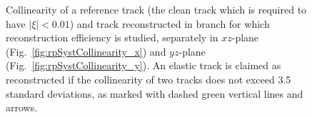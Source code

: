 \begin{figure}[b!]
\centering
\parbox{0.4725\textwidth}{
  \centering
  \begin{subfigure}[b]{\linewidth}
  \end{subfigure}
}%
\quad\quad%
\parbox{0.4725\textwidth}{
  \centering
  \begin{subfigure}[b]{\linewidth}
  \end{subfigure}
}%
\caption[Collinearity of a reference track and track reconstructed in studied branch.]%
    {Collinearity of a reference track (the clean track which is required to have $|\xi|<0.01$) and track reconstructed in branch for which reconstruction efficiency is studied, separately in $xz$-plane (Fig.~\ref{fig:rpSystCollinearity_x}) and $yz$-plane (Fig.~\ref{fig:rpSystCollinearity_y}). An elastic track is claimed as reconstructed if the collinearity of two tracks does not exceed 3.5 standard deviations, as marked with dashed green vertical lines and arrows.}\label{fig:rpSystCollinearity}%
\end{figure}

